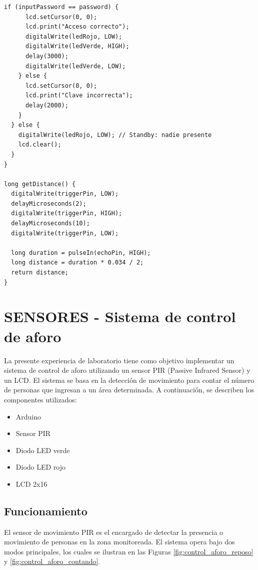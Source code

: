 \begin{lstlisting}[style=cppstyle, caption={Código en C++ para el sistema de control de aforo.}, label={code:cerradura_smart_LCD}]
    if (inputPassword == password) {
      lcd.setCursor(0, 0);
      lcd.print("Acceso correcto");
      digitalWrite(ledRojo, LOW);
      digitalWrite(ledVerde, HIGH);
      delay(3000);
      digitalWrite(ledVerde, LOW);
    } else {
      lcd.setCursor(0, 0);
      lcd.print("Clave incorrecta");
      delay(2000);
    }
  } else {
    digitalWrite(ledRojo, LOW); // Standby: nadie presente
    lcd.clear();
  }
}

long getDistance() {
  digitalWrite(triggerPin, LOW);
  delayMicroseconds(2);
  digitalWrite(triggerPin, HIGH);
  delayMicroseconds(10);
  digitalWrite(triggerPin, LOW);
  
  long duration = pulseIn(echoPin, HIGH);
  long distance = duration * 0.034 / 2;
  return distance;
}
\end{lstlisting}

\section{SENSORES - Sistema de control de aforo}

La presente experiencia de laboratorio tiene como objetivo implementar un sistema de control de aforo utilizando un sensor PIR (Passive Infrared Sensor) y un LCD. El sistema se basa en la detección de movimiento para contar el número de personas que ingresan a un área determinada. A continuación, se describen los componentes utilizados:

\begin{itemize}
    \item Arduino
    \item Sensor PIR
    \item Diodo LED verde
    \item Diodo LED rojo
    \item LCD 2x16
\end{itemize}

\subsection{Funcionamiento}

El sensor de movimiento PIR es el encargado de detectar la presencia o movimiento de personas en la zona monitoreada. El sistema opera bajo dos modos principales, los cuales se ilustran en las Figuras \ref{fig:control_aforo_reposo} y \ref{fig:control_aforo_contando}.

